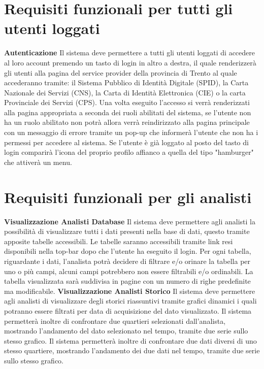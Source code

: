     \section{Requisiti funzionali per tutti gli utenti loggati}
        \begin{rfList}
            \rfItem \textbf{Autenticazione} Il sistema deve permettere a tutti gli utenti loggati di accedere al loro account premendo un tasto di login in altro a destra, il quale renderizzerà gli utenti alla pagina del service provider della provincia di Trento al quale accederanno tramite: il Sistema Pubblico di Identità Digitale (SPID), la Carta Nazionale dei Servizi (CNS), la Carta di Identità Elettronica (CIE) o la carta Provinciale dei Servizi (CPS). Una volta eseguito l'accesso si verrà renderizzati alla pagina appropriata a seconda dei ruoli abilitati del sistema, se l'utente non ha un ruolo abilitato non potrà allora verrà reindirizzato alla pagina principale con un messaggio di errore tramite un pop-up che informerà l'utente che non ha i permessi per accedere al sistema. Se l'utente è già loggato al posto del tasto di login comparirà l'icona del proprio profilo affianco a quella del tipo "hamburger" che attiverà un menu.
        \end{rfList}
    \section{Requisiti funzionali per gli analisti}
        \begin{rfList}
            \rfItem \textbf{Visualizzazione Analisti Database} Il sistema deve permettere agli analisti la possibilità di visualizzare tutti i dati presenti nella base di dati, questo tramite apposite tabelle accessibili. Le tabelle saranno accessibili tramite link resi disponibili nella top-bar dopo che l'utente ha eseguito il login. Per ogni tabella, riguardante i dati, l'analista potrà decidere di filtrare e/o orinare la tabella per uno o più campi, alcuni campi potrebbero non essere filtrabili e/o ordinabili. La tabella visualizzata sarà suddivisa in pagine con un numero di righe predefinite ma modificabile.
            \rfItem \textbf{Visualizzazione Analisti Storico} Il sistema deve permettere agli analisti di visualizzare degli storici riassuntivi tramite grafici dinamici i quali potranno essere filtrati per data di acquisizione del dato visualizzato. Il sistema permetterà inoltre di confrontare due quartieri selezionati dall'analista, mostrando l'andamento del dato selezionato nel tempo, tramite due serie sullo stesso grafico. Il sistema permetterà inoltre di confrontare due dati diversi di uno stesso quartiere, mostrando l'andamento dei due dati nel tempo, tramite due serie sullo stesso grafico. 
        \end{rfList}
